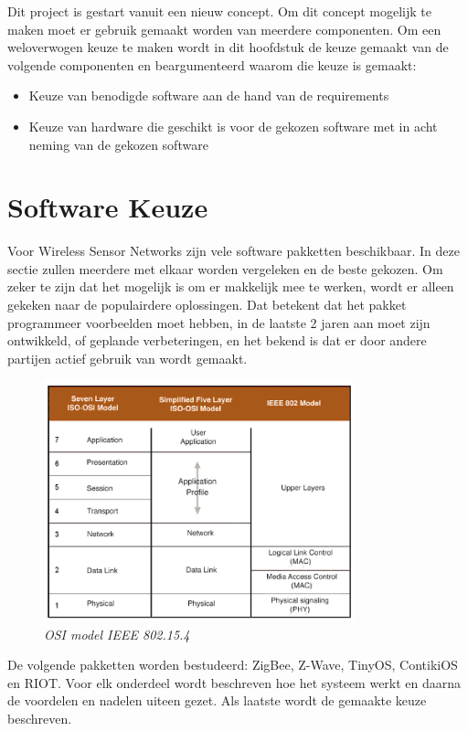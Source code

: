 \documentclass{../local}
\begin{document}
Dit project is gestart vanuit een nieuw concept. Om dit concept mogelijk te maken moet er gebruik gemaakt worden van meerdere componenten. Om een weloverwogen keuze te maken wordt in dit hoofdstuk de keuze gemaakt van de volgende componenten en beargumenteerd waarom die keuze is gemaakt:
\begin{itemize}
\item Keuze van benodigde software aan de hand van de requirements
\item Keuze van hardware die geschikt is voor de gekozen software met in acht neming van de gekozen software

\end{itemize}

\section{Software Keuze}
Voor Wireless Sensor Networks zijn vele software pakketten beschikbaar. In deze sectie zullen meerdere met elkaar worden vergeleken en de beste gekozen. Om zeker te zijn dat het mogelijk is om er makkelijk mee te werken, wordt er alleen gekeken naar de populairdere oplossingen. Dat betekent dat het pakket programmeer voorbeelden moet hebben, in de laatste 2 jaren aan moet zijn ontwikkeld, of geplande verbeteringen, en het bekend is dat er door andere partijen actief gebruik van wordt gemaakt.

\begin{figure}
	\vspace{-15pt}
	\includegraphics[width=9cm]{../images/OSI-IEE802}
	\caption{\emph{OSI model IEEE 802.15.4 \cite{gutierrez2004low}}} \label{fig:OSIIEEE}

\end{figure}

De volgende pakketten worden bestudeerd: ZigBee, Z-Wave, TinyOS, ContikiOS en RIOT. Voor elk onderdeel wordt beschreven hoe het systeem werkt en daarna de voordelen en nadelen uiteen gezet. Als laatste wordt de gemaakte keuze beschreven.
\end{document}
